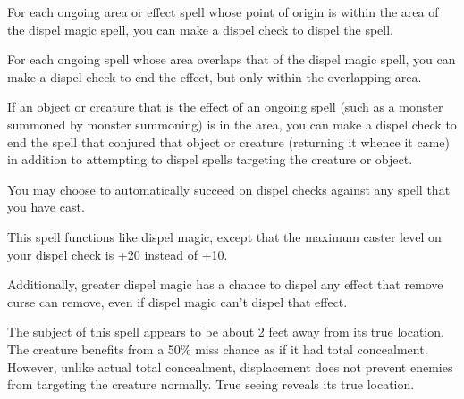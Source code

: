 \begin{multicols}{2}
\begin{small}
{\smallskip\noindent For each ongoing area or effect spell whose point of origin is within the area of the dispel magic spell, you can make a dispel check to dispel the spell.

\smallskip\noindent For each ongoing spell whose area overlaps that of the dispel magic spell, you can make a dispel check to end the effect, but only within the overlapping area.

\smallskip\noindent If an object or creature that is the effect of an ongoing spell (such as a monster summoned by monster summoning) is in the area, you can make a dispel check to end the spell that conjured that object or creature (returning it whence it came) in addition to attempting to dispel spells targeting the creature or object.

\smallskip\noindent You may choose to automatically succeed on dispel checks against any spell that you have cast.}


\noindent This spell functions like dispel magic, except that the maximum caster level on your dispel check is +20 instead of +10.

\smallskip\noindent Additionally, greater dispel magic has a chance to dispel any effect that remove curse can remove, even if dispel magic can't dispel that effect.

\noindent The subject of this spell appears to be about 2 feet away from its true location. The creature benefits from a 50\% miss chance as if it had total concealment. However, unlike actual total concealment, displacement does not prevent enemies from targeting the creature normally. True seeing reveals its true location.



\end{small}
\end{multicols}
